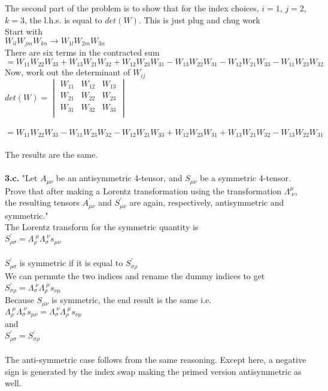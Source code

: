 \documentclass[prb,preprint]
{revtex4-1}
\newcommand{\PRLsep}{\noindent\makebox[\linewidth]{\resizebox{0.8888\linewidth}{2pt}{$\bullet$}}\bigskip}
\begin{document}
The second part of the problem is to show that for the index choices, $i = 1$, $j = 2$, $k = 3$, the l.h.s. is equal to $det\left(W\right)$.  This is just plug and chug work\\
Start with\\
$W_{il}W_{jm}W_{kn} \rightarrow W_{1l}W_{2m}W_{3n}$\\
There are six terms in the contracted sum\\
$= W_{11}W_{22}W_{33} + W_{13}W_{21}W_{32} + W_{12}W_{23}W_{31} - W_{13}W_{22}W_{31} - W_{12}W_{21}W_{33} - W_{11}W_{23}W_{32}$
\\
Now, work out the determinant of $W_{ij}$
\\
$det\left(W\right) = \begin{vmatrix}
W_{11} & W_{12} & W_{13}\\
W_{21} & W_{22} & W_{23}\\
W_{31} & W_{32} & W_{33}\\
\end{vmatrix}$\\\\
$=W_{11}W_{22}W_{33} - W_{11}W_{23}W_{32} - W_{12}W_{21}W_{33} + W_{12}W_{23}W_{31} + W_{13}W_{21}W_{32} - W_{13}W_{22}W_{31}$\\\\
The results are the same.
\\
\PRLsep
\\
{\bf 3.c.}  "Let $A_{\mu\nu}$ be an antisymmetric 4-tensor, and $S_{\mu\nu}$ be a symmetric 4-tensor. Prove that after making a Lorentz transformation using the transformation $\Lambda^\mu_{\;\nu}$, the resulting tensors $A^\prime_{\mu\nu}$ and $S^\prime_{\mu\nu}$ are again, respectively, antisymmetric and symmetric."
\\
The Lorentz transform for the symmetric quantity is 
\\
$S^\prime_{\rho\sigma} = \Lambda_\rho^{\;\mu}\Lambda_\sigma^{\;\nu}s_{\mu\nu}$
\\
\\
$S^\prime_{\rho\sigma}$ is symmetric if it is equal to $S^\prime_{\sigma\rho}$
\\
We can permute the two indices and rename the dummy indices to get
\\
$S^\prime_{\sigma\rho} = \Lambda_\sigma^{\;\nu}\Lambda_\rho^{\;\mu}s_{\nu\mu}$
\\
Because $S_{\mu\nu}$ is symmetric, the end result is the same i.e.
\\
$\Lambda_\rho^{\;\mu}\Lambda_\sigma^{\;\nu}s_{\mu\nu} = \Lambda_\sigma^{\;\nu}\Lambda_\rho^{\;\mu}s_{\nu\mu}$
\\
and
\\
$S^\prime_{\rho\sigma} = S^\prime_{\sigma\rho}$
\\
\\
The anti-symmetric case follows from the same reasoning.  Except here, a negative sign is generated by the index swap making the primed version antisymmetric as well.
\\
\end{document}
